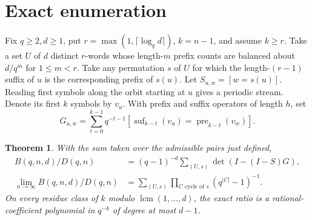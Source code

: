 \documentclass[11pt]{article}
\newtheorem{theorem}{Theorem}
\begin{document}
\section{Exact enumeration}
Fix \(q\ge2,d\ge1\), put \(r=\max(1,\lceil\log_q d\rceil)\), \(k=n-1\), and assume \(k\ge r\). Take a set \(U\) of \(d\) distinct \(r\)-words whose length-\(m\) prefix counts are balanced about \(d/q^m\) for \(1\le m<r\). Take any permutation \(s\) of \(U\) for which the length-\((r-1)\) suffix of \(u\) is the corresponding prefix of \(s(u)\). Let \(S_{u,w}=[w=s(u)]\). Reading first symbols along the orbit starting at \(u\) gives a periodic stream. Denote its first \(k\) symbols by \(v_u\). With prefix and suffix operators of length \(h\), set
\[
 G_{u,w}=\sum_{t=0}^{k-1}q^{-t-1}
 [\operatorname{suf}_{k-t}(v_u)=\operatorname{pre}_{k-t}(v_w)].
\]
\begin{theorem}
With the sum taken over the admissible pairs just defined,
\begin{align}
 B(q,n,d)/D(q,n)&=(q-1)^{-d}\sum_{(U,s)}\det(I-(I-S)G),\label{exact}\\
 \lim_{n\to\infty} B(q,n,d)/D(q,n)
 &=\sum_{(U,s)}\prod_{C\text{ cycle of }s}(q^{|C|}-1)^{-1}.\label{limit}
\end{align}
On every residue class of \(k\) modulo \(\operatorname{lcm}(1,\ldots,d)\), the exact ratio is a rational-coefficient polynomial in \(q^{-k}\) of degree at most \(d-1\).
\end{theorem}
\end{document}
